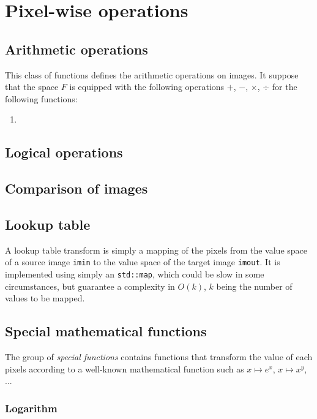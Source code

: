 \chapter{Pixel-wise operations}
\label{chap:pixel_wise_operations}




\section{Arithmetic operations}
\label{sub:arithmetics}
This class of functions defines the arithmetic operations on images. It suppose that the space $F$ is equipped with the following operations $+$, $-$, $\times$, $\div$ for the following functions:
\begin{enumerate}
\item 
\end{enumerate}

\section{Logical operations}
\label{sub:logics}

\section{Comparison of images}
\label{sub:comparisons}

\section{Lookup table}
A lookup table transform is simply a mapping of the pixels from the value space of a source image \lstinline|imin| to the value space of the target image \lstinline|imout|. It is implemented using simply an \lstinline|std::map|, which could be slow in some circumstances, but guarantee a complexity in $O(k)$, $k$ being the number of values to be mapped. 

\section{Special mathematical functions}
\label{sub:special_funcs}
The group of \textit{special functions} contains functions that transform the value of each pixels according to a well-known mathematical function such as $x \mapsto e^x$, $x \mapsto x^y$, ...


\subsection{Logarithm}

